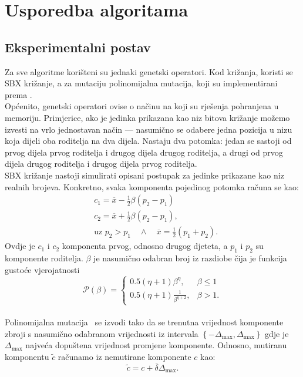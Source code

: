 \documentclass[times, utf8, zavrsni, numeric]{fer}
\begin{document}
\chapter{Usporedba algoritama}
\section{Eksperimentalni postav}
Za sve algoritme korišteni su jednaki genetski operatori. Kod križanja, koristi se SBX križanje, a za mutaciju polinomijalna mutacija, koji su implementirani prema \citep{geneas}.\\
Općenito, genetski operatori ovise o načinu na koji su rješenja pohranjena u memoriju. Primjerice, ako je jedinka prikazana kao niz bitova križanje možemo izvesti na vrlo jednostavan način --- nasumično se odabere jedna pozicija u nizu koja dijeli oba roditelja na dva dijela. Nastaju dva potomka: jedan se sastoji od prvog dijela prvog roditelja i drugog dijela drugog roditelja, a drugi od prvog dijela drugog roditelja i drugog dijela prvog roditelja. \\
SBX križanje nastoji simulirati opisani postupak za jedinke prikazane kao niz realnih brojeva. Konkretno, svaka komponenta pojedinog potomka računa se kao:
\begin{align*}
&c_1 = \overline{x} - \frac{1}{2}\beta(p_2 - p_1)\\
&c_2 = \overline{x} + \frac{1}{2}\beta(p_2 - p_1),\\
&\mbox{uz } p_2 > p_1 \quad \land \quad \overline{x} = \frac{1}{2}(p_1 + p_2).
\end{align*}
Ovdje je $c_1$ i $c_2$ komponenta prvog, odnosno drugog djeteta, a $p_1$ i $p_2$ su komponente roditelja. $\beta$ je nasumično odabran broj iz razdiobe čija je funkcija gustoće vjerojatnosti~\citep{sbx}
\[
    \mathcal{P}(\beta)= 
\begin{cases}
    0.5(\eta+1)\beta^\eta, &\beta \leq 1 \\
    0.5(\eta+1)\frac{1}{\beta^{\eta+2}}, &\beta > 1.
\end{cases}
\]
\\Polinomijalna mutacija~\citep{geneas} se izvodi tako da se trenutna vrijednost komponente zbroji s nasumično odabranom vrijednosti iz intervala $\left\lbrace{-\varDelta_{\max}, \varDelta_{\max}}\right\rbrace$ gdje je $\varDelta_{\max}$ najveća dopuštena vrijednost promjene komponente. Odnosno, mutiranu komponentu $\tilde{c}$ računamo iz nemutirane komponente $c$ kao:
\begin{equation*}
\tilde{c} = c + \overline{\delta}\varDelta_{\max}.
\end{equation*}
\end{document}
